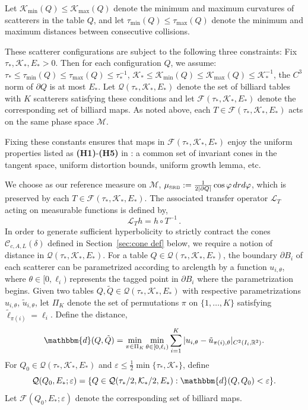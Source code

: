 \documentclass{amsart}
\numberwithin{equation}{section}
\newcommand\cC{{\mathcal C}}
\newcommand\cF{{\mathcal F}}
\newcommand\cK{{\mathcal K}}
\newcommand\cL{{\mathcal L}}
\newcommand\cM{{\mathcal M}}
\newcommand\cQ{{\mathcal Q}}
\newcommand\ve{\varepsilon}
\newcommand\vf{\varphi}
\newcommand{\musrb}{\mu_{\mbox{\tiny SRB}}}
\begin{document}
Let $\cK_{\min}(Q) \le \cK_{\max}(Q)$ denote the minimum and maximum curvatures of scatterers
in the table $Q$, and let $\tau_{\min}(Q) \le \tau_{\max}(Q)$ denote the minimum and maximum
distances between consecutive collisions.


These scatterer configurations are subject to the following three constraints:
Fix $\tau_*, \cK_*, E_*>0$.  Then for each configuration $Q$, we assume:
$\tau_* \le \tau_{\min}(Q) \le \tau_{\max}(Q) \le \tau_*^{-1}$, 
$\cK_* \le \cK_{\min}(Q) \le \cK_{\max}(Q) \le \cK_*^{-1}$,
the $C^3$ norm of $\partial Q$ is at most $E_*$.
Let $\cQ(\tau_*, \cK_*, E_*)$ denote the set of billiard tables with $K$ scatterers satisfying these conditions
and let   
$\cF(\tau_*, \cK_*, E_*)$ denote the corresponding set of billiard maps.
As noted above, each $T \in \cF(\tau_*, \cK_*, E_*)$ acts on the same phase space $\cM$.

Fixing these constants ensures that maps in $\cF(\tau_*, \cK_*, E_*)$ enjoy the uniform
properties listed as {\bf (H1)}-{\bf (H5)} in \cite{DL22}: a common set of invariant cones in 
the tangent space, uniform distortion bounds, uniform growth lemma, etc.

We choose as our reference measure on $\cM$, $\musrb := \frac{1}{2 |\partial Q|} \cos \vf \, dr d\vf$, 
which is preserved by each $T \in \cF(\tau_*, \cK_*, E_*)$.  The associated transfer operator
$\cL_T$ acting on measurable functions is defined by,
\[
\cL_T h = h \circ T^{-1} \, .
\]
In order to generate sufficient hyperbolicity to strictly contract the cones $\cC_{c,A,L}(\delta)$ defined 
in Section~\ref{sec:cone def} below,
we require a notion of distance in $\cQ(\tau_*, \cK_*, E_*)$.  For a table $Q \in \cQ(\tau_*, \cK_*, E_*)$,
the boundary $\partial B_i$ of each scatterer can be parametrized according to arclength by a function
$u_{i, \theta}$, where $\theta \in [0, \ell_i)$ represents the tagged point in $\partial B_i$ 
where the parametrization begins.  Given two tables $Q, \tilde Q \in \cQ(\tau_*, \cK_*, E_*)$ with
respective parametrizations $u_{i,\theta}$, $\tilde u_{i, \theta}$, let $\Pi_K$ denote the set of permutations
$\pi$ on $\{ 1, \ldots, K \}$ satisfying $\tilde \ell_{\pi(i)} = \ell_i$.  Define the distance,
\[
\mathbbm{d}(Q, \tilde Q) = \min_{\pi \in \Pi_K} \min_{\theta \in [0, \ell_i)} \sum_{i=1}^K |u_{i,\theta} - \tilde u_{\pi(i), \theta}|_{C^2(I_i, \mathbb{R}^2)} .
\]
For $Q_0 \in \cQ(\tau_*, \cK_*, E_*)$ and $\ve \le \frac 12 \min \{ \tau_*, \cK_* \}$, define 
\[
\cQ(Q_0, E_*; \ve) = \{ Q \in \cQ(\tau_*/2, \cK_*/2, E_*) : \mathbbm{d}(Q, Q_0) < \ve \} .
\]
Let $\cF(Q_0, E_*; \ve)$ denote the corresponding set of billiard maps.
\end{document}
